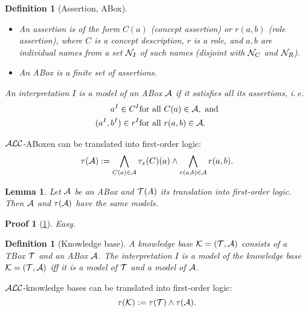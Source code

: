 \documentclass[openany]{scrbook}
\theoremstyle{break}
\newtheorem{Lemma}[Theorem]{Lemma}
\newtheorem{Definition}[Theorem]{Definition}
\theoremstyle{nonumberbreak}
\theoremstyle{nonumberplain}
\theoremstyle{nonumberbreak}
\newtheorem{Proof}{Proof}
\newcommand{\ie}{i{.}\,e{.}\xspace}
\newcommand{\ALC}{{\cal A}{\cal L}{\cal C}}
\begin{document}
\begin{Definition}[Assertion, ABox]
  \label{2.9}
  \begin{itemize}
  \item An assertion is of the form $C(a)$ (concept assertion) or
    $r(a, b)$ (role assertion), where $C$ is a concept description,
    $r$ is a role, and $a, b$ are individual names from a set ${\cal
      N}_I$ of such names (disjoint with ${\cal N}_C$ and ${\cal
      N}_R$).
  \item An ABox is a finite set of assertions.
  \end{itemize}

  An interpretation $I$ is a model of an ABox ${\cal A}$ if it
  satisfies all its assertions, \ie
  \begin{align*}
    a^I \in C^I & \text{for all}\ C(a) \in {\cal A},\ \text{and} \\
    (a^I, b^I) \in r^I & \text{for all}\ r(a, b) \in {\cal A}.
  \end{align*}
\end{Definition}

$\ALC$-ABoxen can be translated into first-order logic:
\begin{equation*}
  \tau({\cal A}) := \bigwedge_{C(a) \in {\cal A}}{\tau_x(C)(a)} \wedge
    \bigwedge_{r(a, b) \in {\cal A}}{r(a, b)}.
\end{equation*}

\begin{Lemma}
  \label{2.10}
  Let ${\cal A}$ be an ABox and ${\cal T}(A)$ its translation into
  first-order logic. Then ${\cal A}$ and $\tau({\cal A})$ have the
  same models.
\end{Lemma}

\begin{Proof}[\cref{2.10}]
  Easy.
\end{Proof}

\begin{Definition}[Knowledge base]
  \label{2.11}
  A knowledge base ${\cal K} = ({\cal T}, {\cal A})$ consists of a
  TBox ${\cal T}$ and an ABox ${\cal A}$. The interpretation $I$ is a
  model of the knowledge base ${\cal K} = ({\cal T}, {\cal A})$ iff it
  is a model of ${\cal T}$ and a model of ${\cal A}$.
\end{Definition}

$\ALC$-knowledge bases can be translated into first-order logic:
\begin{equation*}
  \tau({\cal K}) := \tau({\cal T}) \wedge \tau({\cal A}).
\end{equation*}
\end{document}
